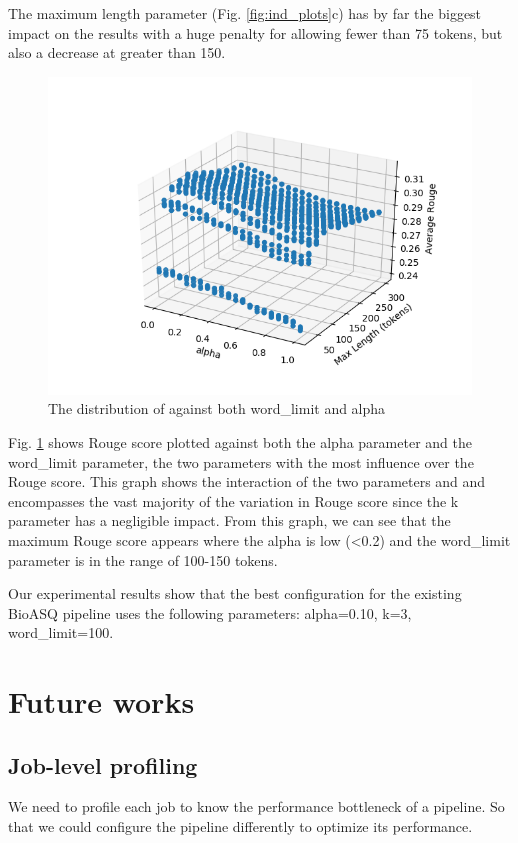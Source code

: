\documentclass{article}
\begin{document}
    The maximum length parameter (Fig. \ref{fig:ind_plots}c) has by far the biggest impact on the results with a huge penalty for allowing fewer than 75 tokens, but also a decrease at greater than 150.

    \begin{figure}[H]
        \begin{center}
            \includegraphics[width=\textwidth]{fig/alpha_wordcount.png}
        \end{center}
        \caption{The distribution of against both word\_limit and alpha}\label{fig:alpha_wordcount}
    \end{figure}

    Fig. \ref{fig:alpha_wordcount} shows Rouge score plotted against both the alpha parameter and the word\_limit parameter, the two parameters with the most influence over the Rouge score.
    This graph shows the interaction of the two parameters and and encompasses the vast majority of the variation in Rouge score since the k parameter has a negligible impact. From this graph,
    we can see that the maximum Rouge score appears where the alpha is low (<0.2) and the word\_limit parameter is in the range of 100-150 tokens.

    Our experimental results show that the best configuration for the existing BioASQ pipeline uses the following parameters: alpha=0.10, k=3, word\_limit=100.


\section{Future works}
    \subsection{Job-level profiling}
    We need to profile each job to know the performance bottleneck of a pipeline.
    So that we could configure the pipeline differently to optimize its performance.
\end{document}
